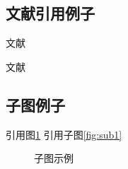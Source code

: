 \documentclass[12pt,a4paper,UTF8]{article}
\begin{document}
\subsection{文献引用例子}

文献\cite{AlexNet}

文献\cite{VGG,ResNet}

\newpage

\subsection{子图例子}

引用图\ref{fig:subfigure}
引用子图\ref{fig:sub1}

\begin{figure}[htbp]
	\centering
	\caption{子图示例}
	\label{fig:subfigure}
\end{figure}
\end{document}
